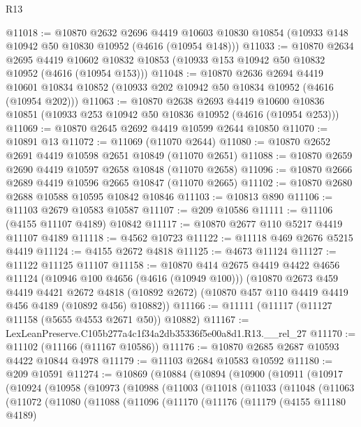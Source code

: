 \begin{lexlean}{R13}
\begin{coremodule}
@11018 := @10870
    @2632
    @2696
    @4419
    @10603
    @10830
    @10854
    (@10933 @148 @10942 @50 @10830 @10952 (@4616 (@10954 @148)))
@11033 := @10870
    @2634
    @2695
    @4419
    @10602
    @10832
    @10853
    (@10933 @153 @10942 @50 @10832 @10952 (@4616 (@10954 @153)))
@11048 := @10870
    @2636
    @2694
    @4419
    @10601
    @10834
    @10852
    (@10933 @202 @10942 @50 @10834 @10952 (@4616 (@10954 @202)))
@11063 := @10870
    @2638
    @2693
    @4419
    @10600
    @10836
    @10851
    (@10933 @253 @10942 @50 @10836 @10952 (@4616 (@10954 @253)))
@11069 := @10870 @2645 @2692 @4419 @10599 @2644 @10850
@11070 := @10891 @13
@11072 := @11069 (@11070 @2644)
@11080 := @10870 @2652 @2691 @4419 @10598 @2651 @10849 (@11070 @2651)
@11088 := @10870 @2659 @2690 @4419 @10597 @2658 @10848 (@11070 @2658)
@11096 := @10870 @2666 @2689 @4419 @10596 @2665 @10847 (@11070 @2665)
@11102 := @10870 @2680 @2688 @10588 @10595 @10842 @10846
@11103 := @10813 @890
@11106 := @11103 @2679 @10583 @10587
@11107 := @209 @10586
@11111 := @11106 (@4155 @11107 @4189) @10842
@11117 := @10870 @2677 @110 @5217 @4419 @11107 @4189
@11118 := @4562 @10723
@11122 := @11118 @469 @2676 @5215 @4419
@11124 := @4155 @2672 @4818
@11125 := @4673 @11124
@11127 := @11122 @11125 @11107
@11158 := @10870
    @414
    @2675
    @4419
    @4422
    @4656
    @11124
    (@10946 @100 @4656 (@4616 (@10949 @100)))
    (@10870
      @2673
      @459
      @4419
      @4421
      @2672
      @4818
      (@10892 @2672)
      (@10870 @457 @110 @4419 @4419 @456 @4189 (@10892 @456) @10882))
@11166 := @11111 (@11117 (@11127 @11158 (@5655 @4553 @2671 @50)) @10882)
@11167 := LexLeanPreserve.C105b277a4c1f34a2db35336f5e00a8d1.R13.__rel_27
@11170 := @11102 (@11166 (@11167 @10586))
@11176 := @10870 @2685 @2687 @10593 @4422 @10844 @4978
@11179 := @11103 @2684 @10583 @10592
@11180 := @209 @10591
@11274 := @10869
    (@10884
      (@10894
        (@10900
          (@10911
            (@10917
              (@10924
                (@10958
                  (@10973
                    (@10988
                      (@11003
                        (@11018
                          (@11033
                            (@11048
                              (@11063
                                (@11072
                                  (@11080
                                    (@11088
                                      (@11096
                                        (@11170
                                          (@11176
                                            (@11179
                                              (@4155 @11180 @4189)

\end{coremodule}
\end{lexlean}

